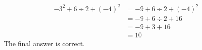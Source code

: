 {\begin{equation*}
	\begin{split}
		-3^2 + 6 \div 2 + (-4)^2 & = -9 + 6 \div 2 + (-4)^2 \\
					 & = -9 + 6 \div 2 + 16 \\
					 & = -9 + 3 + 16 \\
					 & = 10
	\end{split}
\end{equation*} }
{The final answer is correct.}
